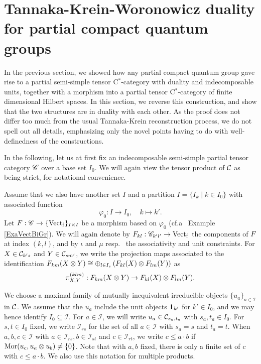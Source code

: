 \section{Tannaka-Krein-Woronowicz duality for partial compact quantum groups}


In the previous section, we showed how any partial compact quantum group gave rise to a partial semi-simple tensor C$^*$-category with duality and indecomposable units, together with a morphism into a partial tensor C$^*$-category of finite dimensional Hilbert spaces. In this section, we reverse this construction, and show that the two structures are in duality with each other. As the proof does not differ too much from the usual Tannaka-Krein reconstruction process, we do not spell out all details, emphasizing only the novel points having to do with well-definedness of the constructions.  %

In the following, let us at first fix an indecomposable semi-simple partial tensor category $\mathscr{C}$ over a base set $I_0$. We will again view the tensor product of $\mathcal{C}$ as being strict, for notational convenience. 

Assume that we also have another set $I$ and a partition $I = \{I_k\mid k\in I_0\}$ with associated function \[\varphi_0:I\rightarrow I_0, \quad k\mapsto k'.\] Let $F: \mathscr{C}\rightarrow \{\mathrm{Vect}_{\operatorname{\mathrm{f}}}\}_{I\times I}$ be a morphism based on $\varphi_0$ (cf.a~ Example \ref{ExaVectBiGr}).  We will again denote by $F_{kl}:\mathscr{C}_{k'l'}\rightarrow \mathrm{Vect}_{\operatorname{\mathrm{f}}}$ the components of $F$ at index $(k,l)$, and by $\iota$ and $\mu$ resp.~ the associativity and unit constraints.  For $X\in \mathcal{C}_{k's}$ and $Y\in \mathcal{C}_{sm'}$, we write the projection maps associated to the identification $F_{km}(X\otimes Y)\cong \oplus_{l\in I_s} \left(F_{kl}(X)\otimes F_{lm}(Y)\right)$ as \[\pi^{(klm)}_{X,Y}:F_{km}(X\otimes Y) \rightarrow F_{kl}(X)\otimes F_{lm}(Y).\]

We choose a maximal family of mutually inequivalent irreducible objects $\{u_a\}_{a\in \mathcal{I}}$ in $\mathcal{C}$. We assume that the $u_a$ include the unit objects $\mathbf{1}_{k'}$ for $k'\in I_0$, and we may hence identify $I_0\subseteq \mathcal{I}$. For $a\in \mathcal{I}$, we will write $u_a \in \mathcal{C}_{s_a,t_a}$ with $s_a,t_a\in I_0$. For $s,t\in I_0$ fixed, we write $\mathcal{I}_{rs}$ for the set of all $a\in \mathcal{I}$ with $s_a=s$ and $t_a=t$. When $a,b,c\in \mathcal{I}$ with $a\in \mathcal{I}_{rs},b\in \mathcal{I}_{st}$ and $c\in \mathcal{I}_{rt}$, we write $c\leq a\cdot b$ if $\mathrm{Mor}(u_c,u_a\otimes u_b)\neq \{0\}$. Note that with $a,b$ fixed, there is only a finite set of $c$ with $c\leq a\cdot b$. We also use this notation for multiple products.

